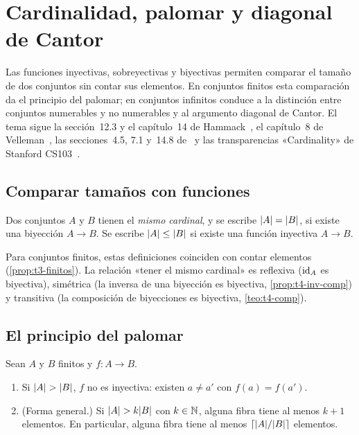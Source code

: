 \chapter{Cardinalidad, palomar y diagonal de Cantor}
\label{tema:6}

Las funciones inyectivas, sobreyectivas y biyectivas permiten comparar el tamaño de dos conjuntos sin contar sus elementos. En conjuntos finitos esta comparación da el principio del palomar; en conjuntos infinitos conduce a la distinción entre conjuntos numerables y no numerables y al argumento diagonal de Cantor. El tema sigue la sección~12.3 y el capítulo~14 de Hammack~\cite{hammack}, el capítulo~8 de Velleman~\cite{velleman}, las secciones~4.5, 7.1 y~14.8 de~\cite{mcs} y las transparencias «Cardinality» de Stanford CS103~\cite{cs103card}.

\section{Comparar tamaños con funciones}

\begin{definicion}[Equipotencia]
Dos conjuntos $A$ y $B$ tienen el \emph{mismo cardinal}, y se escribe $\lvert A\rvert=\lvert B\rvert$, si existe una biyección $A\to B$. Se escribe $\lvert A\rvert\le\lvert B\rvert$ si existe una función inyectiva $A\to B$.
\end{definicion}

Para conjuntos finitos, estas definiciones coinciden con contar elementos (\cref{prop:t3-finitos}). La relación «tener el mismo cardinal» es reflexiva ($\mathrm{id}_A$ es biyectiva), simétrica (la inversa de una biyección es biyectiva, \cref{prop:t4-inv-comp}) y transitiva (la composición de biyecciones es biyectiva, \cref{teo:t4-comp}).

\addtocounter{definicion}{1}%

\section{El principio del palomar}

\begin{teorema}\label{teo:t6-palomar}
Sean $A$ y $B$ finitos y $f\colon A\to B$.
\begin{enumerate}
  \item Si $\lvert A\rvert>\lvert B\rvert$, $f$ no es inyectiva: existen $a\neq a'$ con $f(a)=f(a')$.
  \item (Forma general.) Si $\lvert A\rvert>k\lvert B\rvert$ con $k\in\mathbb{N}$, alguna fibra tiene al menos $k+1$ elementos. En particular, alguna fibra tiene al menos $\lceil\lvert A\rvert/\lvert B\rvert\rceil$ elementos.
\end{enumerate}
\end{teorema}

